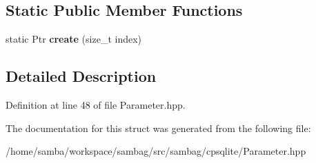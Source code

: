 \subsection*{Static Public Member Functions}
\begin{DoxyCompactItemize}
\item 
\hypertarget{structsambag_1_1cpsqlite_1_1_null_parameter_a2fbf99f0185716dd633c949b720f665c}{
static Ptr {\bfseries create} (size\_\-t index)}
\label{structsambag_1_1cpsqlite_1_1_null_parameter_a2fbf99f0185716dd633c949b720f665c}

\end{DoxyCompactItemize}


\subsection{Detailed Description}


Definition at line 48 of file Parameter.hpp.



The documentation for this struct was generated from the following file:\begin{DoxyCompactItemize}
\item 
/home/samba/workspace/sambag/src/sambag/cpsqlite/Parameter.hpp\end{DoxyCompactItemize}
